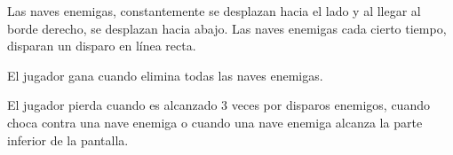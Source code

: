 \documentclass[letterpaper,11pt,oneside]{article}
\begin{document}
\begin{enumerate}
        Las naves enemigas, constantemente se desplazan hacia el lado y al llegar al borde derecho, se desplazan hacia abajo. Las naves enemigas cada cierto tiempo, disparan un disparo en línea recta. 

        El jugador gana cuando elimina todas las naves enemigas.

        El jugador pierda cuando es alcanzado 3 veces por disparos enemigos, cuando choca contra una nave enemiga o cuando una nave enemiga alcanza la parte inferior de la pantalla.

\end{enumerate}




\end{document}
